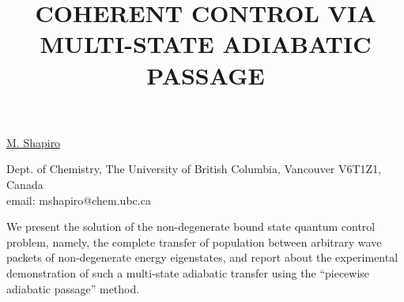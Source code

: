 \title{COHERENT CONTROL VIA MULTI-STATE ADIABATIC PASSAGE}

\underline{M. Shapiro}


Dept. of Chemistry, The University of British Columbia, Vancouver V6T1Z1, Canada\\
email: mshapiro@chem.ubc.ca

We present the solution of the non-degenerate bound state quantum control problem, namely, the complete transfer of population between arbitrary wave packets of non-degenerate energy eigenstates, and report about the experimental demonstration of such a multi-state adiabatic transfer using the ``piecewise adiabatic passage'' method.

\vspace{\baselineskip}